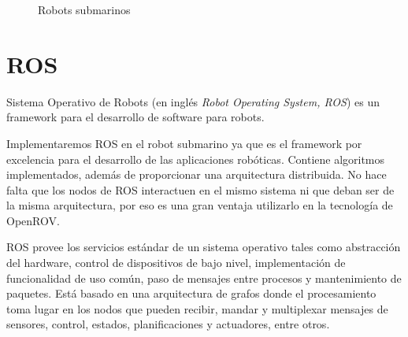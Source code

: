 \begin{figure}[hbtp]
  \begin{center}
  \end{center}
  \caption{Robots submarinos}
  \label{fig:submarino}
\end{figure}
  
\section{ROS}
\label{cap:ROS}

Sistema Operativo de Robots (en inglés \textit{Robot Operating System, ROS}\cite{ros}) es un framework para el desarrollo de software para robots. 

Implementaremos ROS en el robot submarino ya que es el framework por excelencia para el desarrollo de las aplicaciones robóticas. Contiene algoritmos implementados, además de proporcionar una arquitectura distribuida. No hace falta que los nodos de ROS interactuen en el mismo sistema ni que deban ser de la misma arquitectura, por eso es una gran ventaja utilizarlo en la tecnología de OpenROV. 

ROS provee los servicios estándar de un sistema operativo tales como abstracción del hardware, control de dispositivos de bajo nivel, implementación de funcionalidad de uso común, paso de mensajes entre procesos y mantenimiento de paquetes. Está basado en una arquitectura de grafos donde el procesamiento toma lugar en los nodos que pueden recibir, mandar y multiplexar mensajes de sensores, control, estados, planificaciones y actuadores, entre otros.

